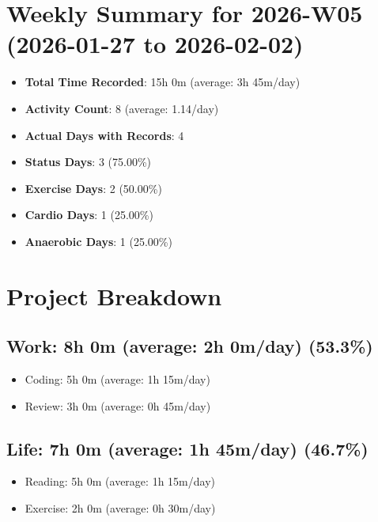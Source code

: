 \documentclass[12pt]{extarticle}
\begin{document}
{\fontsize{18}{21.6}\selectfont\section*{Weekly Summary for 2026-W05 (2026-01-27 to 2026-02-02)}}

\begin{itemize}[topsep=0pt, itemsep=-0.5ex]
    \item \textbf{Total Time Recorded}: 15h 0m (average: 3h 45m/day)
    \item \textbf{Activity Count}: 8 (average: 1.14/day)
    \item \textbf{Actual Days with Records}: 4
    \item \textbf{Status Days}: 3 (75.00\%)
    \item \textbf{Exercise Days}: 2 (50.00\%)
    \item \textbf{Cardio Days}: 1 (25.00\%)
    \item \textbf{Anaerobic Days}: 1 (25.00\%)
\end{itemize}

{\fontsize{16}{19.2}\selectfont\section*{Project Breakdown}}

{\fontsize{16}{19.2}\selectfont\subsection*{Work: 8h 0m (average: 2h 0m/day) (53.3\%)}}
\begin{itemize}[topsep=0pt, itemsep=-0.5ex]
    \item Coding: 5h 0m (average: 1h 15m/day)
    \item Review: 3h 0m (average: 0h 45m/day)
\end{itemize}
{\fontsize{16}{19.2}\selectfont\subsection*{Life: 7h 0m (average: 1h 45m/day) (46.7\%)}}
\begin{itemize}[topsep=0pt, itemsep=-0.5ex]
    \item Reading: 5h 0m (average: 1h 15m/day)
    \item Exercise: 2h 0m (average: 0h 30m/day)
\end{itemize}
\end{document}
